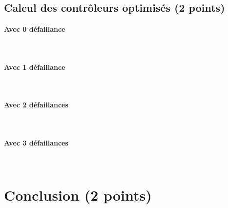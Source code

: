 \documentclass[a4paper]{book}
\begin{document}
\subsection{Calcul des contrôleurs optimisés (2 points)}
\paragraph{Avec 0 défaillance}\ \\


\paragraph{Avec 1 défaillance}\ \\


\paragraph{Avec 2 défaillances}\ \\


\paragraph{Avec 3 défaillances}\ \\


\section{Conclusion (2 points)}
\end{document}
